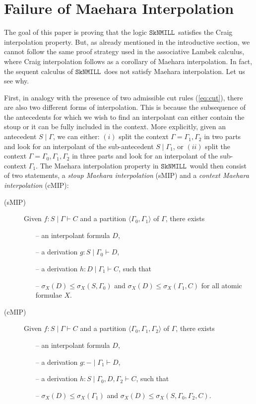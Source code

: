 \documentclass[sn-mathphys-num]{sn-jnl}%
\newcommand{\GG}{\Gamma}
\newcommand{\vd}{\vdash}
\newcommand{\SkNMILL}{$\mathtt{SkNMILL}$}
\newcommand{\gs}[1]{\sigma_{X} (#1)}
\newcommand{\sMIP}{\textsf{sMIP}}
\newcommand{\cMIP}{\textsf{cMIP}}
\theoremstyle{thmstyleone}%
\theoremstyle{thmstyletwo}%
\theoremstyle{thmstylethree}%
\begin{document}
\section{Failure of Maehara Interpolation}\label{sec:failure}

The goal of this paper is proving that the logic \SkNMILL~satisfies the Craig interpolation property. But, as already mentioned in the introductive section, we cannot follow the same proof strategy used in the associative Lambek calculus, where Craig interpolation follows as a corollary of Maehara interpolation.
In fact, the sequent calculus of \SkNMILL~does not satisfy Maehara interpolation. Let us see why.

First, in analogy with the presence of two admissible cut rules (\ref{eq:cut}), there are also two different forms of interpolation. This is because the subsequence of the antecedents for which we wish to find an interpolant can either contain the stoup or it can be fully included in the context. More explicitly, given an antecedent $S \mid \GG$, we can either: $(i)$ split the context $\GG = \GG_1,\GG_2$ in two parts and look for an interpolant of the sub-antecedent $S \mid \GG_1$, or $(ii)$ split the context $\GG = \GG_0,\GG_1,\GG_2$ in three parts and look for an interpolant of the sub-context $\GG_1$.
The Maehara interpolation property in \SkNMILL~would then consist of two statements, a \emph{stoup Maehara interpolation} (\sMIP) and a \emph{context Maehara interpolation} (\cMIP):
\begin{description}
  \item[(\sMIP)] Given $f: S \mid \GG \vd C$ and a partition $\langle \GG_0,\GG_1 \rangle$ of $\GG$, there exists  
  \begin{itemize}
    \item[--] an interpolant formula $D$,
    \item[--] a derivation $g : S \mid \GG_0 \vd D$,
    \item[--] a derivation $h : D \mid \GG_1 \vd C$, such that
    \item[--] $\gs{D} \leq \gs{S , \GG_0}$ and $\gs{D} \leq \gs{\GG_1 , C}$ for all atomic formulae $X$.
  \end{itemize}
  \item[(\cMIP)] Given $f: S \mid \GG \vd C$ and a partition $\langle \GG_0,\GG_1, \GG_2 \rangle$ of $\GG$, there exists  
  \begin{itemize}
    \item[--] an interpolant formula $D$,
    \item[--] a derivation $g : {-} \mid \GG_1 \vd D$,
    \item[--] a derivation $h : S \mid \GG_0, D, \GG_2 \vd C$, such that
    \item[--] $\gs{D} \leq \gs{\GG_1}$ and $\gs{D} \leq \gs{S , \GG_0 , \GG_2 , C}$.    
  \end{itemize}
\end{description}
\end{document}
